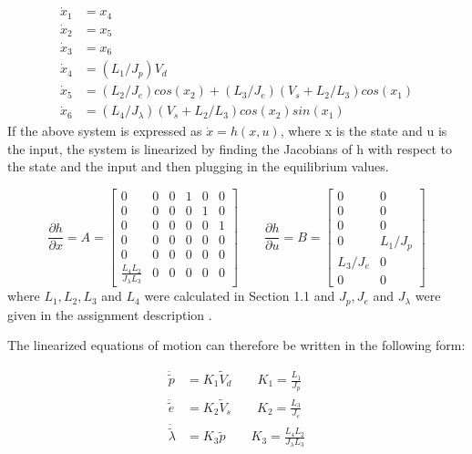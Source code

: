 \begin{subequations}
  \label{eq:full state equations}
  \begin{align}
    \dot{x}_1 &= x_4 \\
    \dot{x}_2 &= x_5 \\
    \dot{x}_3 &= x_6 \\
    \dot{x}_4 &= (L_1/J_p) V_d \\
    \dot{x}_5 &= (L_2/J_e)cos(x_2) + (L_3/J_e)(V_s + L_2 / L_3)cos(x_1) \\
    \dot{x}_6 &= (L_4 / J_\lambda) (V_s + L_2 / L_3)cos(x_2)sin(x_1)
  \end{align}
\end{subequations}
If the above system is expressed as $\dot{x} = h(x, u)$, where x is
the state and u is the input, the system is linearized by finding the
Jacobians of h with respect to the state and the input and then
plugging in the equilibrium values.

\begin{equation}
  \label{eq:Linearized Jacobians}
  \frac{\partial h}{\partial x} = A =
  \begin{bmatrix}
    0 & 0 & 0 & 1 & 0 & 0 \\
    0 & 0 & 0 & 0 & 1 & 0 \\
    0 & 0 & 0 & 0 & 0 & 1 \\
    0 & 0 & 0 & 0 & 0 & 0 \\
    0 & 0 & 0 & 0 & 0 & 0 \\
    \frac{L_4L_2}{J_\lambda L_3} & 0 & 0 & 0 & 0 & 0
  \end{bmatrix}
  \qquad
  \frac{\partial h}{\partial u} = B =
  \begin{bmatrix}
    0 & 0 \\
    0 & 0 \\
    0 & 0 \\
    0 & L_1/J_p \\
    L_3/J_e & 0 \\
    0 & 0
  \end{bmatrix}
\end{equation}
where $L_1, L_2, L_3$ and $L_4$ were calculated in Section 1.1 and
$J_p, J_e$ and $J_\lambda$ were given in the assignment description
\cite[p.14]{assignment}.


The linearized equations of motion can therefore be written in the
following form:

\begin{subequations}
  \label{eq:linearized EoM}
  \begin{align}
    \ddot{\tilde{p}} &= K_1\tilde{V}_d \qquad K_1 = \frac{L_1}{J_p} \label{eq:linearized pitch EoM}\\
    \ddot{\tilde{e}} &= K_2\tilde{V}_s \qquad K_2 = \frac{L_3}{J_e} \label{eq:linearized elevation EoM}\\
    \ddot{\tilde{\lambda}} &= K_3\tilde{p} \qquad K_3 = \frac{L_4L_2}{J_\lambda L_3} \label{eq:linearized travel EoM}
  \end{align}
\end{subequations}
